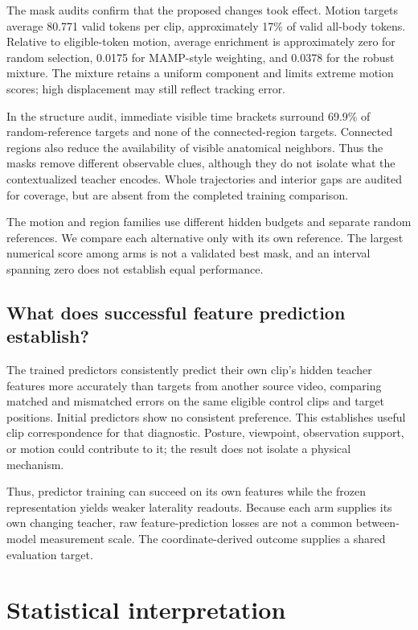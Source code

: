\documentclass{article}
\begin{document}
The mask audits confirm that the proposed changes took effect. Motion targets average 80.771 valid tokens per clip, approximately 17\% of valid all-body tokens. Relative to eligible-token motion, average enrichment is approximately zero for random selection, 0.0175 for MAMP-style weighting, and 0.0378 for the robust mixture. The mixture retains a uniform component and limits extreme motion scores; high displacement may still reflect tracking error.

In the structure audit, immediate visible time brackets surround 69.9\% of random-reference targets and none of the connected-region targets. Connected regions also reduce the availability of visible anatomical neighbors. Thus the masks remove different observable clues, although they do not isolate what the contextualized teacher encodes. Whole trajectories and interior gaps are audited for coverage, but are absent from the completed training comparison.

The motion and region families use different hidden budgets and separate random references. We compare each alternative only with its own reference. The largest numerical score among arms is not a validated best mask, and an interval spanning zero does not establish equal performance.

\subsection{What does successful feature prediction establish?}\label{what-does-successful-feature-prediction-establish}

The trained predictors consistently predict their own clip's hidden teacher features more accurately than targets from another source video, comparing matched and mismatched errors on the same eligible control clips and target positions. Initial predictors show no consistent preference. This establishes useful clip correspondence for that diagnostic. Posture, viewpoint, observation support, or motion could contribute to it; the result does not isolate a physical mechanism.

Thus, predictor training can succeed on its own features while the frozen representation yields weaker laterality readouts. Because each arm supplies its own changing teacher, raw feature-prediction losses are not a common between-model measurement scale. The coordinate-derived outcome supplies a shared evaluation target.

\section{Statistical interpretation}\label{statistical-interpretation}
\end{document}
